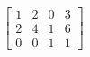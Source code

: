 \documentclass[preview]{standalone}
\begin{document}
\begin{align*}
\begin{bmatrix} 1 & 2 & 0 & 3 \\ 2 & 4 & 1 & 6 \\ 0 & 0 & 1 & 1 \end{bmatrix}
\end{align*}
\end{document}
